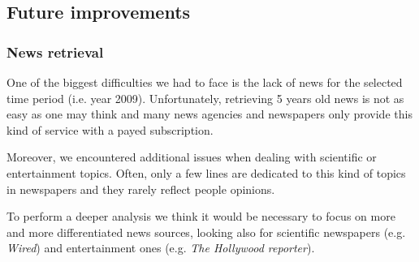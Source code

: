 \subsection*{Future improvements}
\subsubsection*{News retrieval}
One of the biggest difficulties we had to face is the lack of news for the
selected time period (i.e. year 2009). Unfortunately, retrieving 5 years old
news is not as easy as one may think and many news agencies and newspapers only
provide this kind of service with a payed subscription.

Moreover, we encountered additional issues when dealing with scientific or
entertainment topics. Often, only a few lines are dedicated to this kind of
topics in newspapers and they rarely reflect people opinions.

To perform a deeper analysis we think it would be necessary to focus on more and
more differentiated news sources, looking also for scientific newspapers (e.g.
\emph{Wired}) and entertainment ones (e.g. \emph{The Hollywood reporter}).

